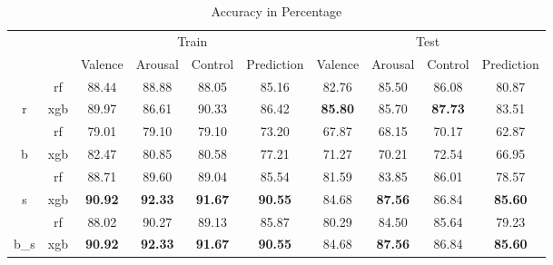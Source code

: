 \begin{table}[t]
\caption{Accuracy in Percentage} %
\centering
\hspace*{-1.8cm}
\begin{tabular}{cc|c|c|c|c|c|c|c|c|}
\cline{3-10}
                                                &     & \multicolumn{4}{c|}{Train}               & \multicolumn{4}{c|}{Test}                \\ \cline{3-10} 
                                                &     & Valence & Arousal & Control & Prediction & Valence & Arousal & Control & Prediction \\ \hline
\multicolumn{1}{|c|}{}                          & rf  & 88.44   & 88.88   & 88.05   & 85.16      & 82.76   & 85.50   & 86.08   & 80.87      \\ \cline{2-10} 
\multicolumn{1}{|c|}{\multirow{-2}{*}{r}} &
  xgb &
  89.97 &
  86.61 &
  90.33 &
  86.42 &
  \cellcolor[HTML]{FFFC9E}\textbf{85.80} &
  85.70 &
  \cellcolor[HTML]{FFFC9E}\textbf{87.73} &
  83.51 \\ \hline
\multicolumn{1}{|c|}{}                          & rf  & 79.01   & 79.10   & 79.10   & 73.20      & 67.87   & 68.15   & 70.17   & 62.87      \\ \cline{2-10} 
\multicolumn{1}{|c|}{\multirow{-2}{*}{b}}       & xgb & 82.47   & 80.85   & 80.58   & 77.21      & 71.27   & 70.21   & 72.54   & 66.95      \\ \hline
\multicolumn{1}{|c|}{}                          & rf  & 88.71   & 89.60   & 89.04   & 85.54      & 81.59   & 83.85   & 86.01   & 78.57      \\ \cline{2-10} 
\multicolumn{1}{|c|}{\multirow{-2}{*}{s}} &
  xgb &
  \cellcolor[HTML]{FFFC9E}\textbf{90.92} &
  \cellcolor[HTML]{FFFC9E}\textbf{92.33} &
  \cellcolor[HTML]{FFFC9E}\textbf{91.67} &
  \cellcolor[HTML]{FFFC9E}\textbf{90.55} &
  84.68 &
  \cellcolor[HTML]{FFFC9E}\textbf{87.56} &
  86.84 &
  \cellcolor[HTML]{FFFC9E}\textbf{85.60} \\ \hline
\multicolumn{1}{|c|}{}                          & rf  & 88.02   & 90.27   & 89.13   & 85.87      & 80.29   & 84.50   & 85.64   & 79.23      \\ \cline{2-10} 
\multicolumn{1}{|c|}{\multirow{-2}{*}{b\_s}} &
  xgb &
  \cellcolor[HTML]{FFFC9E}\textbf{90.92} &
  \cellcolor[HTML]{FFFC9E}\textbf{92.33} &
  \cellcolor[HTML]{FFFC9E}\textbf{91.67} &
  \cellcolor[HTML]{FFFC9E}\textbf{90.55} &
  84.68 &
  \cellcolor[HTML]{FFFC9E}\textbf{87.56} &
  86.84 &
  \cellcolor[HTML]{FFFC9E}\textbf{85.60} \\ \hline

\end{tabular}
\end{table}
